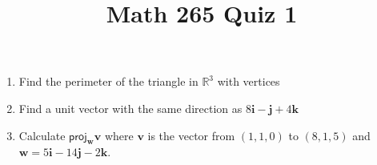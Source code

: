 \documentclass[12pt]{article}
\title{Math 265 Quiz 1}\author{}
\begin{document}
\maketitle
\pagestyle{empty}
\begin{enumerate}
\item Find the perimeter of the triangle in $\mathbb{R}^3$
with vertices
\item Find a unit vector with the same direction as
$8\mathbf{i}-\mathbf{j}+4\mathbf{k}$
\item Calculate $\mathsf{proj}_\mathbf{w}\mathbf{v}$
where $\mathbf{v}$ is the vector from $\left(1,1,0\right)$
to $\left(8,1,5\right)$ and $\mathbf{w}=5\mathbf{i}
-14\mathbf{j}-2\mathbf{k}$.

\end{enumerate}
\end{document}
